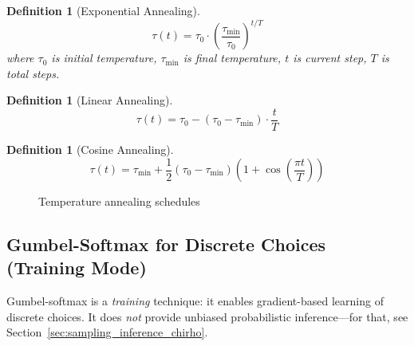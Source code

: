 \documentclass[11pt,a4paper]{article}
\newtheorem{definition}[theorem]{Definition}
\begin{document}
\begin{definition}[Exponential Annealing]
\label{def:exp_anneal_chirho}
\[
\tau(t) = \tau_0 \cdot \left(\frac{\tau_{\min}}{\tau_0}\right)^{t/T}
\]
where $\tau_0$ is initial temperature, $\tau_{\min}$ is final temperature, $t$ is current step, $T$ is total steps.
\end{definition}

\begin{definition}[Linear Annealing]
\label{def:linear_anneal_chirho}
\[
\tau(t) = \tau_0 - (\tau_0 - \tau_{\min}) \cdot \frac{t}{T}
\]
\end{definition}

\begin{definition}[Cosine Annealing]
\label{def:cosine_anneal_chirho}
\[
\tau(t) = \tau_{\min} + \frac{1}{2}(\tau_0 - \tau_{\min})\left(1 + \cos\left(\frac{\pi t}{T}\right)\right)
\]
\end{definition}

\begin{figure}[ht]
\centering
{}
\caption{Temperature annealing schedules}
\label{fig:annealing_chirho}
\end{figure}

\subsection{Gumbel-Softmax for Discrete Choices (Training Mode)}
\label{subsec:gumbel_chirho}

Gumbel-softmax is a \emph{training} technique: it enables gradient-based learning of discrete choices.
It does \emph{not} provide unbiased probabilistic inference---for that, see Section~\ref{sec:sampling_inference_chirho}.
\end{document}
